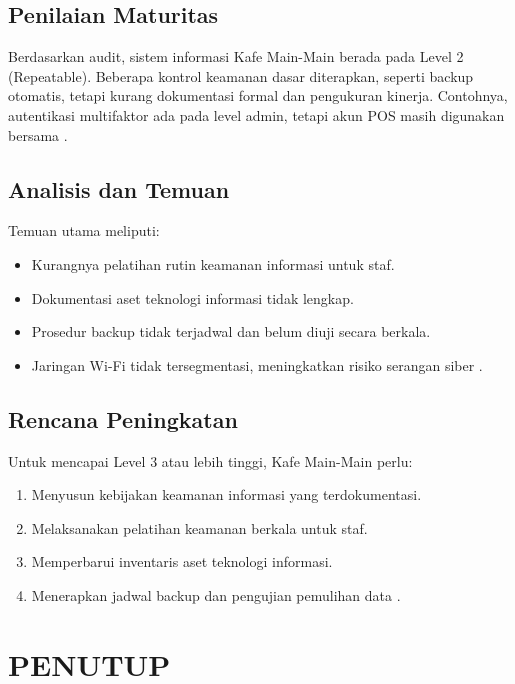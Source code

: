\documentclass[12pt, a4paper]{report}
\begin{document}
\section{Penilaian Maturitas}
Berdasarkan audit, sistem informasi Kafe Main-Main berada pada Level 2 (Repeatable). Beberapa kontrol keamanan dasar diterapkan, seperti backup otomatis, tetapi kurang dokumentasi formal dan pengukuran kinerja. Contohnya, autentikasi multifaktor ada pada level admin, tetapi akun POS masih digunakan bersama \citep{widodo2022keamanan, sari2023backup}.

\section{Analisis dan Temuan}
Temuan utama meliputi:
\begin{itemize}
    \item Kurangnya pelatihan rutin keamanan informasi untuk staf.
    \item Dokumentasi aset teknologi informasi tidak lengkap.
    \item Prosedur backup tidak terjadwal dan belum diuji secara berkala.
    \item Jaringan Wi-Fi tidak tersegmentasi, meningkatkan risiko serangan siber \citep{haryanto2021wifi}.
\end{itemize}

\section{Rencana Peningkatan}
Untuk mencapai Level 3 atau lebih tinggi, Kafe Main-Main perlu:
\begin{enumerate}
    \item Menyusun kebijakan keamanan informasi yang terdokumentasi.
    \item Melaksanakan pelatihan keamanan berkala untuk staf.
    \item Memperbarui inventaris aset teknologi informasi.
    \item Menerapkan jadwal backup dan pengujian pemulihan data \citep{rokhman2018implementasi}.
\end{enumerate}


\chapter{PENUTUP}
\label{bab:penutup}
\end{document}
